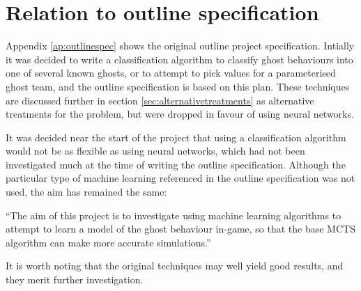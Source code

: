 \section{Relation to outline specification}
\label{sec:relationoutlinespec}

Appendix \ref{ap:outlinespec} shows the original outline project specification.  Intially it was decided to write a classification algorithm to classify ghost behaviours into one of several known ghosts, or to attempt to pick values for a parameterised ghost team, and the outline specification is based on this plan.  These techniques are discussed further in section \ref{sec:alternativetreatments} as alternative treatments for the problem, but were dropped in favour of using neural networks.

It was decided near the start of the project that using a classification algorithm would not be as flexible as using neural networks, which had not been investigated much at the time of writing the outline specification.  Although the particular type of machine learning referenced in the outline specification was not used, the aim has remained the same:

``The aim of this project is to investigate using machine learning algorithms to attempt to learn a model of the ghost behaviour in-game, so that the base MCTS algorithm can make more accurate simulations.''

It is worth noting that the original techniques may well yield good results, and they merit further investigation.

